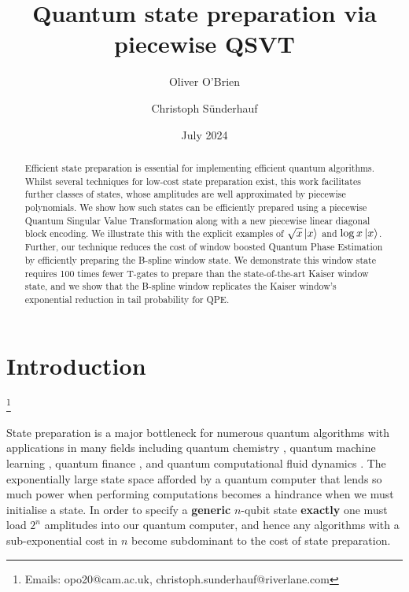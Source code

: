 \documentclass[aps,prx,twocolumn,floatfix,10pt,amssymb,amsfont,amsmath,superscriptaddress,float,nofootinbib,longbibliography,nobalancelastpage]{revtex4-2}
\theoremstyle{empty}
\newcommand\blfootnote[1]{%
  \begingroup
  \renewcommand\thefootnote{}\footnote{#1}%
  \addtocounter{footnote}{-1}%
  \endgroup
}
\begin{document}
\title{Quantum state preparation via piecewise QSVT}

\author{Oliver O'Brien}
\author{Christoph S{\"u}nderhauf}
\date{July 2024}

\begin{abstract}
    Efficient state preparation is essential for implementing efficient quantum algorithms. Whilst several techniques for low-cost state preparation exist, this work facilitates further classes of states, whose amplitudes are well approximated by piecewise polynomials. We show how such states can be efficiently prepared using a piecewise Quantum Singular Value Transformation along with a new piecewise linear diagonal block encoding. We illustrate this with the explicit examples of $\sqrt{x}\ket{x}$ and $\log x\ket{x}$. Further, our technique reduces the cost of window boosted Quantum Phase Estimation by efficiently preparing the B-spline window state. We demonstrate this window state requires 100 times fewer T-gates to prepare than the state-of-the-art Kaiser window state, and we show that the B-spline window replicates the Kaiser window's exponential reduction in tail probability for QPE.
\end{abstract}

\maketitle

\tableofcontents

\section{Introduction}
\blfootnote{Emails: opo20@cam.ac.uk, christoph.sunderhauf@riverlane.com}
State preparation is a major bottleneck for numerous quantum algorithms with applications in many fields including quantum chemistry \cite{Aspuru_Guzik_2005,RevModPhys.92.015003, PRXQuantum.2.040332, Huggins:2024hpa}, quantum machine learning \cite{Aaronson:2015scy}, quantum finance \cite{Chakrabarti2021thresholdquantum, Gonzalez-Conde:2021zbv, PhysRevE.103.063302, Dalzell:2022ysw}, and quantum computational fluid dynamics \cite{Lapworth:2022rcw}. The exponentially large state space afforded by a quantum computer that lends so much power when performing computations becomes a hindrance when we must initialise a state. In order to specify a \textbf{generic} $n$-qubit state \textbf{exactly} one must load $2^n$ amplitudes into our quantum computer, and hence any algorithms with a sub-exponential cost in $n$ become subdominant to the cost of state preparation. 
\end{document}
